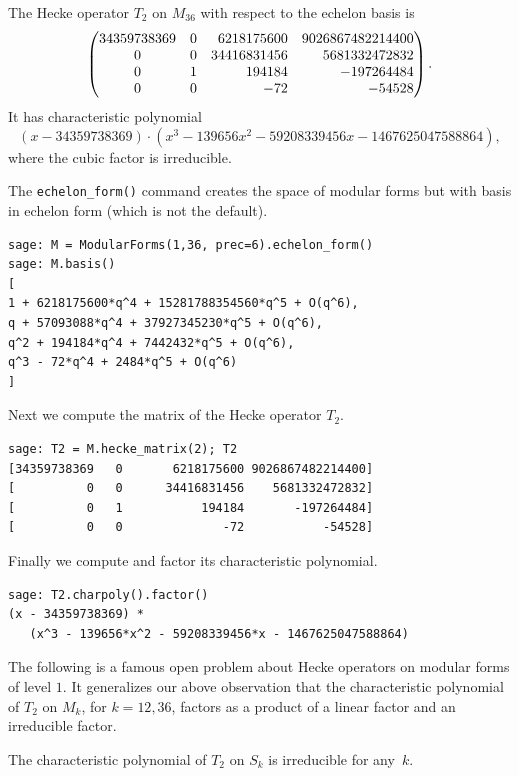\begin{example}
The Hecke operator $T_2$ on $M_{36}$ with respect to the
echelon basis is
$$
\left(
\begin{matrix}
\hfill 34359738369&\hfill0&\hfill6218175600&\hfill9026867482214400\\
0&\hfill0&\hfill34416831456&\hfill5681332472832\\
0&\hfill1&\hfill194184&\hfill-197264484\\
0&\hfill0&\hfill-72&\hfill-54528\\
\end{matrix}\right).
$$
It has characteristic polynomial 
$$
(x - 34359738369) \cdot
(x^3 - 139656x^2 - 59208339456x - 1467625047588864),
$$
where the cubic factor is irreducible.

The {\tt echelon\_form()} command creates the space of modular forms
but with basis in echelon form (which is not the default).
\begin{verbatim}
sage: M = ModularForms(1,36, prec=6).echelon_form()
sage: M.basis()
[
1 + 6218175600*q^4 + 15281788354560*q^5 + O(q^6),
q + 57093088*q^4 + 37927345230*q^5 + O(q^6),
q^2 + 194184*q^4 + 7442432*q^5 + O(q^6),
q^3 - 72*q^4 + 2484*q^5 + O(q^6)
]
\end{verbatim}%

Next we compute the matrix of the Hecke operator $T_2$.
\begin{verbatim}
sage: T2 = M.hecke_matrix(2); T2
[34359738369   0       6218175600 9026867482214400]
[          0   0      34416831456    5681332472832]
[          0   1           194184       -197264484]
[          0   0              -72           -54528]
\end{verbatim}%

Finally we compute and factor its characteristic polynomial.

\begin{verbatim}
sage: T2.charpoly().factor()
(x - 34359738369) * 
   (x^3 - 139656*x^2 - 59208339456*x - 1467625047588864)
\end{verbatim}
\end{example}


The following is a famous  open problem about
Hecke operators on modular forms of level $1$.  It generalizes
our above observation that the characteristic polynomial of $T_2$
on $M_k$, for $k=12, 36$, factors as a product of a linear factor
and an irreducible factor.
\begin{conjecture}[Maeda]
The characteristic polynomial of $T_2$ on $S_k$ is irreducible for any~$k$.
\end{conjecture}

